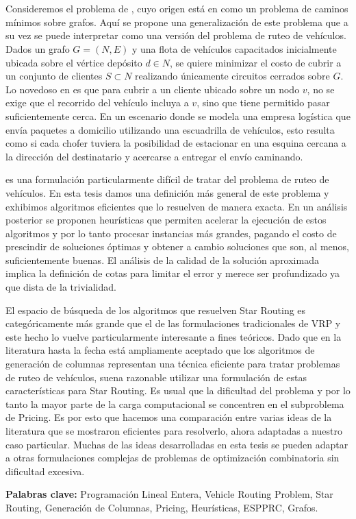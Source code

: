 \chapter*{\runtitulo}

\noindent Consideremos el problema de , cuyo origen está en \cite{tagliavini} como un problema de caminos mínimos sobre grafos. Aquí se propone una generalización de este problema que a su vez se puede interpretar como una versión del problema de ruteo de vehículos. Dados un grafo $G = (N, E)$ y una flota de vehículos capacitados inicialmente ubicada sobre el vértice depósito $d \in N$, se quiere minimizar el costo de cubrir a un conjunto de clientes $S \subset N$ realizando únicamente circuitos cerrados sobre $G$. Lo novedoso en  es que para cubrir a un cliente ubicado sobre un nodo $v$, no se exige que el recorrido del vehículo incluya a $v$, sino que tiene permitido pasar suficientemente cerca. En un escenario donde se modela una empresa logística que envía paquetes a domicilio utilizando una escuadrilla de vehículos, esto resulta como si cada chofer tuviera la posibilidad de estacionar en una esquina cercana a la dirección del destinatario y acercarse a entregar el envío caminando.

 es una formulación particularmente difícil de tratar del problema de ruteo de vehículos. En esta tesis damos una definición más general de este problema y exhibimos algoritmos eficientes que lo resuelven de manera exacta. En un análisis posterior se proponen heurísticas que permiten acelerar la ejecución de estos algoritmos y por lo tanto procesar instancias más grandes, pagando el costo de prescindir de soluciones óptimas y obtener a cambio soluciones que son, al menos, suficientemente buenas. El análisis de la calidad de la solución aproximada implica la definición de cotas para limitar el error y merece ser profundizado ya que dista de la trivialidad.

El espacio de búsqueda de los algoritmos que resuelven Star Routing es categóricamente más grande que el de las formulaciones tradicionales de VRP y este hecho lo vuelve particularmente interesante a fines teóricos. Dado que en la literatura hasta la fecha está ampliamente aceptado que los algoritmos de generación de columnas representan una técnica eficiente para tratar problemas de ruteo de vehículos, suena razonable utilizar una formulación de estas características para Star Routing. Es usual que la dificultad del problema y por lo tanto la mayor parte de la carga computacional se concentren en el subproblema de Pricing. Es por esto que hacemos una comparación entre varias ideas de la literatura que se mostraron eficientes para resolverlo, ahora adaptadas a nuestro caso particular. Muchas de las ideas desarrolladas en esta tesis se pueden adaptar a otras formulaciones complejas de problemas de optimización combinatoria sin dificultad excesiva. 

\bigskip

\noindent\textbf{Palabras clave:} Programación Lineal Entera, Vehicle Routing Problem, Star Routing, Generación de Columnas, Pricing, Heurísticas, ESPPRC, Grafos.
